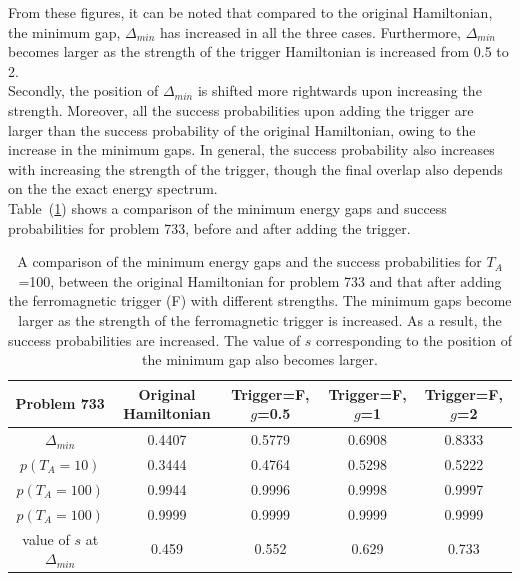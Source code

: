 \documentclass[../main.tex]{subfiles}
\begin{document}
From these figures, it can be noted that compared to the original Hamiltonian, the minimum gap, $\Delta_{min}$ has increased in all the three cases. Furthermore, $\Delta_{min}$ becomes larger as the strength of the trigger Hamiltonian is increased from 0.5 to 2. \\
Secondly, the position of $\Delta_{min}$ is shifted more rightwards upon increasing the strength. 
Moreover, all the success probabilities upon adding the trigger are larger than the success probability of the original Hamiltonian, owing to the increase in the minimum gaps. In general, the success probability also increases with increasing the strength of the trigger, though the final overlap also depends on the the exact energy spectrum. \\
Table~(\ref{tab:f1}) shows a comparison of the minimum energy gaps and success probabilities for problem 733, before and after adding the trigger. 
\begin{table}[H]
\centering
\renewcommand{\arraystretch}{1.3}
\begin{tabular}{|c|c|c|c|c|}
\hline 
Problem 733 & Original Hamiltonian & Trigger=F, $g$=0.5 & Trigger=F, $g$=1 & Trigger=F, $g$=2 \\ 
\hline 
$\Delta_{min}$ & 0.4407 & 0.5779 & 0.6908 & 0.8333 \\ 
\hline 
$p(T_A=10)$ & 0.3444 & 0.4764 & 0.5298 & 0.5222 \\ 
\hline
$p(T_A=100)$ & 0.9944 & 0.9996 & 0.9998 & 0.9997 \\ 
\hline
$p(T_A=100)$ & 0.9999 & 0.9999 & 0.9999 & 0.9999 \\ 

\hline 
value of $s$ at $\Delta_{min}$ & 0.459 & 0.552 & 0.629 & 0.733 \\
\hline

\end{tabular} 
\caption{A comparison of the minimum energy gaps and the success probabilities for $T_A$=100, between the original Hamiltonian for problem 733 and that after adding the ferromagnetic trigger (F) with different strengths. The minimum gaps become larger as the strength of the ferromagnetic trigger is increased. As a result, the success probabilities are increased. The value of $s$ corresponding to the position of the minimum gap also becomes larger.}
\label{tab:f1}
\end{table}
\end{document}
